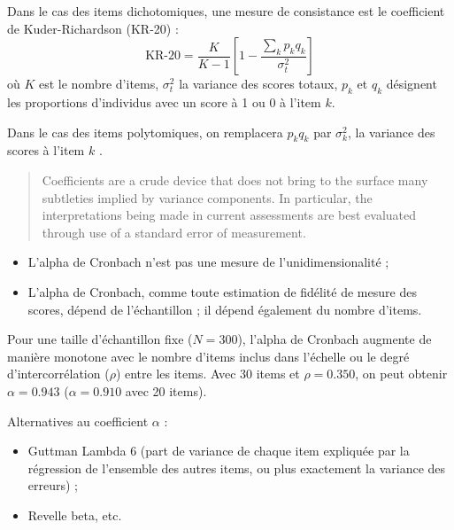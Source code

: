 Dans le cas des items dichotomiques, une mesure de consistance est le
coefficient de Kuder-Richardson (KR-20) \autocite{kuder37}:
\begin{equation}
\text{KR-20}=\frac{K}{K-1}\left[1-\frac{\sum_k p_kq_k}{\sigma_t^2}\right]
\end{equation}
où $K$ est le nombre d'items, $\sigma_t^2$ la variance des scores totaux, $p_k$
et $q_k$ désignent les proportions d'individus avec un score à 1 ou 0 à l'item
$k$. 

Dans le cas des items polytomiques, on remplacera $p_kq_k$ par
$\sigma_k^2$, la variance des scores à l'item $k$ \autocite{cronbach51}.


\begin{quote}
Coefficients are a crude device that does not bring to the surface
many subtleties implied by variance components. In particular, the
interpretations being made in current assessments are best evaluated
through use of a standard error of measurement\autocite{Cronbach2004}.
\end{quote}

\begin{itemize}
\item L'alpha de Cronbach n'est pas une mesure de
  l'unidimensionalité\autocite{danes84} ;
\item L'alpha de Cronbach, comme toute estimation de fidélité de mesure des
  scores, dépend de l'échantillon ; il dépend également du nombre d'items.
\end{itemize}

\foilhead{}

Pour une taille d'échantillon fixe ($N=300$), l'alpha de Cronbach augmente de
manière monotone avec le nombre d'items inclus dans l'échelle ou le degré
d'intercorrélation ($\rho$) entre les items. Avec 30 items et $\rho=0.350$, on
peut obtenir $\alpha=0.943$ ($\alpha=0.910$ avec 20 items).

Alternatives au coefficient $\alpha$ :
\begin{itemize}
\item Guttman Lambda 6 (part de variance de chaque item expliquée par la
  régression de l'ensemble des autres items, ou plus exactement la variance des
  erreurs) ;
\item Revelle beta, etc.
\end{itemize}

